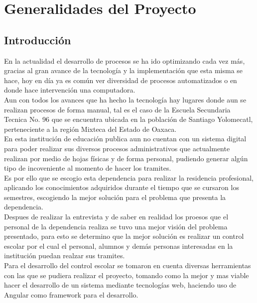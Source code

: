 \renewcommand{\thesection}{\Roman{section}}
\section{Generalidades del Proyecto}

\renewcommand{\thesection}{\arabic{section}}
\subsection{Introducción}

{\large En la actualidad el desarrollo de procesos se ha ido optimizando cada vez más, gracias al gran avance de la tecnología y la implementación que esta misma se hace, hoy en día ya es común ver diversidad de procesos automatizados o en donde hace intervención una computadora.}\\

{\large Aun con todos los avances que ha hecho la tecnología hay lugares donde aun se realizan procesos de forma manual, tal es el caso de la Escuela Secundaria Tecnica No. 96 que se encuentra ubicada en la población de Santiago Yolomecatl, perteneciente a la región Mixteca del Estado de Oaxaca.}\\

{\large En esta institución de educación publica aun no cuentan con un sistema digital para poder realizar sus diversos procesos administrativos que actualmente realizan por medio de hojas físicas y de forma personal, pudiendo generar algún tipo de incoveniente al momento de hacer los tramites.}\\

{\large Es por ello que se escogio esta dependencia para realizar la residencia profesional, aplicando los conocimientos adquiridos durante el tiempo que se cursaron los semestres, escogiendo la mejor solución para el problema que presenta la dependencia. }\\

{\large Despues de realizar la entrevista y de saber en realidad los proesos que el personal de la dependencia realiza se tuvo una mejor visión del problema presentado, para esto se determino que la mejor solución es realizar un control escolar por el cual el personal, alumnos y demás personas interesadas en la institución puedan realzar sus tramites.}\\

{\large Para el desarrollo del control escolar se tomaron en cuenta diversas herramientas con las que se pudiera realizar el proyecto, tomando como la mejor y mas viable hacer el desarrollo de un sistema mediante tecnologías web, haciendo uso de Angular como framework para el desarrollo.}\\

